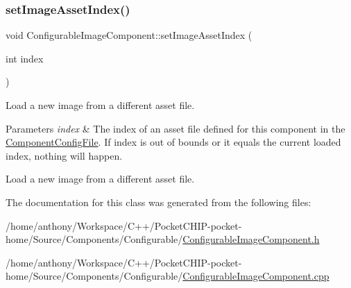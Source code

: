 \mbox{\label{classConfigurableImageComponent_a6ba9337ff07830dec610540c12277234}} 
\subsubsection{\texorpdfstring{set\+Image\+Asset\+Index()}{setImageAssetIndex()}}
{\footnotesize\ttfamily void Configurable\+Image\+Component\+::set\+Image\+Asset\+Index (\begin{DoxyParamCaption}\item[{int}]{index }\end{DoxyParamCaption})}

Load a new image from a different asset file.


\begin{DoxyParams}{Parameters}
{\em index} & The index of an asset file defined for this component in the \mbox{\hyperlink{classComponentConfigFile}{Component\+Config\+File}}. If index is out of bounds or it equals the current loaded index, nothing will happen.\\
\hline
\end{DoxyParams}
Load a new image from a different asset file. 

The documentation for this class was generated from the following files\+:\begin{DoxyCompactItemize}
\item 
/home/anthony/\+Workspace/\+C++/\+Pocket\+C\+H\+I\+P-\/pocket-\/home/\+Source/\+Components/\+Configurable/\mbox{\hyperlink{ConfigurableImageComponent_8h}{Configurable\+Image\+Component.\+h}}\item 
/home/anthony/\+Workspace/\+C++/\+Pocket\+C\+H\+I\+P-\/pocket-\/home/\+Source/\+Components/\+Configurable/\mbox{\hyperlink{ConfigurableImageComponent_8cpp}{Configurable\+Image\+Component.\+cpp}}\end{DoxyCompactItemize}
